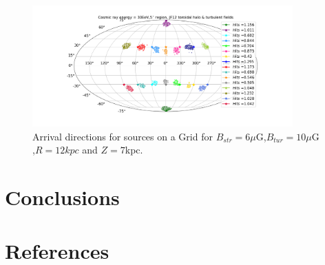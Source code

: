 \documentclass[12pt, a4 paper]{article}
\begin{document}
\begin{figure}[h!]
    \includegraphics[width = 10cm]{Images/JF12_TorH_Tur_particles1e5_30EeV (1).png}
    \caption{Arrival directions for sources on a Grid for $B_{str} = 6\mu$G,$B_{tur} =10\mu$G ,$R = 12kpc$ and $Z = 7$kpc.}
    \label{fig:my_label}
\end{figure}
\restoregeometry
\section{Conclusions}
\clearpage
\section{References}

\printbibliography[heading=none]

\nocite{*}

\newpage
\end{document}
